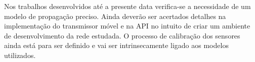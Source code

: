 Nos trabalhos desenvolvidos até a presente data verifica-se a necessidade de um modelo de propagação preciso. Ainda deverão ser acertados detalhes na implementação do transmissor móvel e na API no intuito de criar um ambiente de desenvolvimento da rede estudada. O processo de calibração dos sensores ainda está para ser definido e vai ser intrinsecamente ligado aos modelos utilizados.